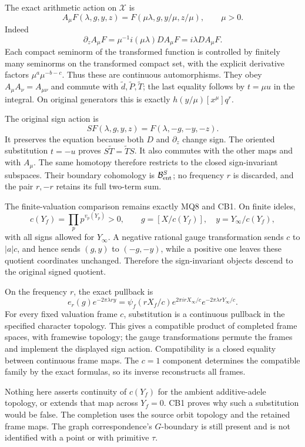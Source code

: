 The exact arithmetic action on \(\mathcal X\) is \[
A_\mu F(\lambda,g,y,z)
=F(\mu\lambda,g,y/\mu,z/\mu),\qquad\mu>0.
\tag{CCB5.1}
\] Indeed \[
\partial_zA_\mu F
=\mu^{-1}i(\mu\lambda)D A_\mu F=i\lambda D A_\mu F.
\] Each compact seminorm of the transformed function is controlled by
finitely many seminorms on the transformed compact set, with the
explicit derivative factors \(\mu^a\mu^{-b-c}\). Thus these are
continuous automorphisms. They obey \(A_\mu A_\nu=A_{\mu\nu}\) and
commute with \(\widetilde d,\widetilde P,\widetilde T\); the last
equality follows by \(t=\mu u\) in the integral. On original generators
this is exactly \(h(y/\mu)[x^\mu]q^r\).

The original sign action is \[
SF(\lambda,g,y,z)=F(\lambda,-g,-y,-z).
\tag{CCB5.2}
\] It preserves the equation because both \(D\) and \(\partial_z\)
change sign. The oriented substitution \(t=-u\) proves
\(S\widetilde T=\widetilde TS\). It also commutes with the other maps
and with \(A_\mu\). The same homotopy therefore restricts to the closed
sign-invariant subspaces. Their boundary cohomology is
\(\mathcal B_{\rm ent}^{S}\); no frequency \(r\) is discarded, and the
pair \(r,-r\) retains its full two-term sum.

The finite-valuation comparison remains exactly MQ8 and CB1. On finite
ideles, \[
c(Y_f)=\prod_p p^{v_p(Y_p)}>0,\qquad
g=[X/c(Y_f)],\quad y=Y_\infty/c(Y_f),
\tag{CCB5.3}
\] with all signs allowed for \(Y_\infty\). A negative rational gauge
transformation sends \(c\) to \(|a|c\), and hence sends \((g,y)\) to
\((-g,-y)\), while a positive one leaves these quotient coordinates
unchanged. Therefore the sign-invariant objects descend to the original
signed quotient.

On the frequency \(r\), the exact pullback is \[
e_r(g)e^{-2\pi\lambda ry}
=\psi_f(rX_f/c)e^{2\pi irX_\infty/c}
 e^{-2\pi\lambda rY_\infty/c}.
\tag{CCB5.4}
\] For every fixed valuation frame \(c\), substitution is a continuous
pullback in the specified character topology. This gives a compatible
product of completed frame spaces, with framewise topology; the gauge
transformations permute the frames and implement the displayed sign
action. Compatibility is a closed equality between continuous frame
maps. The \(c=1\) component determines the compatible family by the
exact formulas, so its inverse reconstructs all frames.

Nothing here asserts continuity of \(c(Y_f)\) for the ambient
additive-adele topology, or extends that map across \(Y_f=0\). CB1
proves why such a substitution would be false. The completion uses the
source orbit topology and the retained frame maps. The graph
correspondence's \(G\)-boundary is still present and is not identified
with a point or with primitive \(\tau\).

